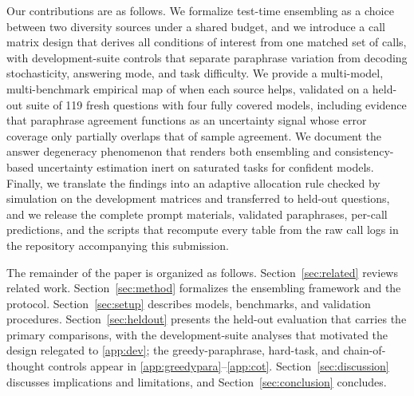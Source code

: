 Our contributions are as follows. We formalize test-time ensembling as a choice between two diversity sources under a shared budget, and we introduce a call matrix design that derives all conditions of interest from one matched set of calls, with development-suite controls that separate paraphrase variation from decoding stochasticity, answering mode, and task difficulty. We provide a multi-model, multi-benchmark empirical map of when each source helps, validated on a held-out suite of 119 fresh questions with four fully covered models, including evidence that paraphrase agreement functions as an uncertainty signal whose error coverage only partially overlaps that of sample agreement. We document the answer degeneracy phenomenon that renders both ensembling and consistency-based uncertainty estimation inert on saturated tasks for confident models. Finally, we translate the findings into an adaptive allocation rule checked by simulation on the development matrices and transferred to held-out questions, and we release the complete prompt materials, validated paraphrases, per-call predictions, and the scripts that recompute every table from the raw call logs in the repository accompanying this submission.

The remainder of the paper is organized as follows. Section~\ref{sec:related} reviews related work. Section~\ref{sec:method} formalizes the ensembling framework and the protocol. Section~\ref{sec:setup} describes models, benchmarks, and validation procedures. Section~\ref{sec:heldout} presents the held-out evaluation that carries the primary comparisons, with the development-suite analyses that motivated the design relegated to \ref{app:dev}; the greedy-paraphrase, hard-task, and chain-of-thought controls appear in \ref{app:greedypara}--\ref{app:cot}. Section~\ref{sec:discussion} discusses implications and limitations, and Section~\ref{sec:conclusion} concludes.

